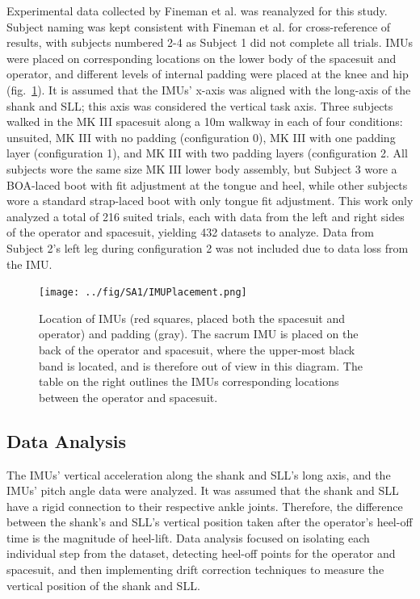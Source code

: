 \documentclass[defaultstyle,11pt]{thesis}
\begin{document}
Experimental data collected by Fineman et al.\citep{Fineman2018} was reanalyzed for this study.
Subject naming was kept consistent with Fineman et al.\citep{Fineman2018} for cross-reference of results, with subjects numbered 2-4 as Subject 1 did not complete all trials.
IMUs were placed on corresponding locations on the lower body of the spacesuit and operator, and different levels of internal padding were placed at the knee and hip (fig.~\ref{fig:SA1-Loc}).
It is assumed that the IMUs' x-axis was aligned with the long-axis of the shank and SLL; this axis was considered the vertical task axis.
Three subjects walked in the MK III spacesuit along a 10m walkway in each of four conditions: unsuited, MK III with no padding (configuration 0), MK III with one padding layer (configuration 1), and MK III with two padding layers (configuration 2.
All subjects wore the same size MK III lower body assembly, but Subject 3 wore a BOA-laced boot with fit adjustment at the tongue and heel, while other subjects wore a standard strap-laced boot with only tongue fit adjustment.
This work only analyzed a total of 216 suited trials, each with data from the left and right sides of the operator and spacesuit, yielding 432 datasets to analyze.
Data from Subject 2's left leg during configuration 2 was not included due to data loss from the IMU.

\begin{figure}
\hypertarget{fig:SA1-Loc}{%
\centering
\texttt{[image: ../fig/SA1/IMUPlacement.png]}
\caption{Location of IMUs (red squares, placed both the spacesuit and operator) and padding (gray). The sacrum IMU is placed on the back of the operator and spacesuit, where the upper-most black band is located, and is therefore out of view in this diagram. The table on the right outlines the IMUs corresponding locations between the operator and spacesuit.}\label{fig:SA1-Loc}
}
\end{figure}

\hypertarget{data-analysis}{%
\subsection{Data Analysis}\label{data-analysis}}

The IMUs' vertical acceleration along the shank and SLL's long axis, and the IMUs' pitch angle data were analyzed.
It was assumed that the shank and SLL have a rigid connection to their respective ankle joints.
Therefore, the difference between the shank's and SLL's vertical position taken after the operator's heel-off time is the magnitude of heel-lift.
Data analysis focused on isolating each individual step from the dataset, detecting heel-off points for the operator and spacesuit, and then implementing drift correction techniques to measure the vertical position of the shank and SLL.
\end{document}
